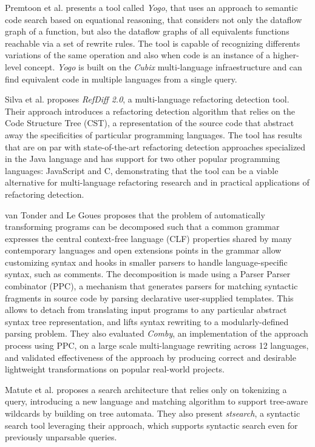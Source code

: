 \documentclass[10pt,sigplan,screen,review,anonymous]{acmart}
\begin{document}
Premtoon et al.\cite{premtoon2020-code-search-equational-reasoning} presents 
a tool called \textit{Yogo}, that uses an approach to semantic code search 
based on equational reasoning, that considers not only the dataflow graph of 
a function, but also the dataflow graphs of all equivalents functions reachable 
via a set of rewrite rules. The tool is capable of recognizing differents 
variations of the same operation and also when code is an instance of a 
higher-level concept.
\textit{Yogo} is built on the \textit{Cubix} multi-language infraestructure and can find
equivalent code in multiple languages from a single query.

Silva et al.\cite{silva2021-refdiff} proposes \textit{RefDiff 2.0}, a 
multi-language refactoring detection tool. Their approach introduces a 
refactoring detection algorithm that relies on the Code Structure Tree 
(CST), a representation of the source code that abstract away the 
specificities of particular programming languages. 
The tool has results that are on par with state-of-the-art refactoring 
detection approaches specialized in the Java language and has support 
for two other popular programming languages: JavaScript and C,
demonstrating that the tool can be a viable alternative for multi-language
refactoring research and in practical applications of refactoring detection.

van Tonder and Le Goues\cite{vanTonder2019-syntax-transformation-ppc} proposes
that the problem of automatically transforming programs can be decomposed such
that a common grammar expresses the central context-free language (CLF) 
properties shared by many contemporary languages and open extensions points
in the grammar allow customizing syntax and hooks in smaller parsers to handle
language-specific syntax, such as comments. The decomposition is made using a
Parser Parser combinator (PPC), a mechanism that generates parsers for matching
syntactic fragments in source code by parsing declarative user-supplied 
templates. 
This allows to detach from translating input programs to any particular 
abstract syntax tree representation, and lifts syntax rewriting to a 
modularly-defined parsing problem. 
They also evaluated \textit{Comby}, an implementation of the approach process using PPC,
on a large scale multi-language rewriting across 12 languages, and validated 
effectiveness of the approach by producing correct and desirable lightweight 
transformations on popular real-world projects.

Matute et al.\cite{matute2024-sequence-tree-matching} proposes a search
architecture that relies only on tokenizing a query, introducing a new 
language and matching algorithm to support tree-aware wildcards by building
on tree automata. They also present \textit{stsearch}, a syntactic search
tool leveraging their approach, which supports syntactic search even for
previously unparsable queries.
\end{document}
